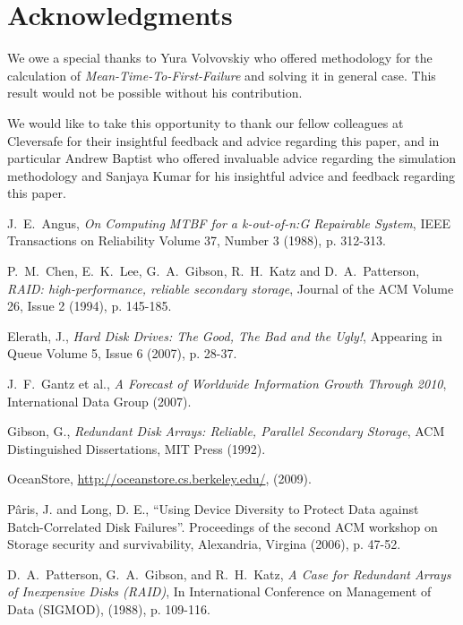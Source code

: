 \documentclass[XXX,endnotes]{usetex-v1}
\begin{document}
\section*{Acknowledgments}

We owe a special thanks to Yura Volvovskiy who offered methodology for the calculation of \emph{Mean-Time-To-First-Failure} and solving it in general case.  This result would not be possible without his contribution.
 
We would like to take this opportunity to thank our fellow colleagues at Cleversafe for their insightful feedback and advice regarding this paper, and in particular Andrew Baptist who offered invaluable advice regarding the simulation methodology and Sanjaya Kumar for his insightful advice and feedback regarding this paper.

\begin{thebibliography}{99}

 J.~E.~Angus,
\emph{On Computing MTBF for a k-out-of-n:G Repairable System}, IEEE Transactions on Reliability Volume 37, Number 3 (1988), p. 312-313.

 P.~M.~Chen, E.~K.~Lee, G.~A.~Gibson, R.~H.~Katz and D.~A.~Patterson,
\emph{RAID: high-performance, reliable secondary storage}, Journal of the ACM Volume 26, Issue 2 (1994), p. 145-185.

 Elerath, J.,
\emph{Hard Disk Drives: The Good, The Bad and the Ugly!}, Appearing in Queue Volume 5, Issue 6 (2007), p. 28-37.

 J.~F.~Gantz et al., \emph{A Forecast of Worldwide Information Growth Through 2010}, International Data Group (2007).

 Gibson, G.,
\emph{Redundant Disk Arrays: Reliable, Parallel Secondary Storage}, ACM Distinguished Dissertations, MIT Press (1992).

 OceanStore, \url{http://oceanstore.cs.berkeley.edu/}, (2009).

  P\^aris, J. and Long, D. E., ``Using Device Diversity to Protect Data against Batch-Correlated Disk Failures''. Proceedings of the second ACM workshop on Storage security and survivability, Alexandria, Virgina (2006), p. 47-52.

 D.~A.~Patterson, G.~A.~Gibson, and R.~H.~Katz,
\emph{A Case for Redundant Arrays of Inexpensive Disks (RAID)}, In International Conference on Management of Data (SIGMOD), (1988), p. 109-116.


\end{thebibliography}
\end{document}
